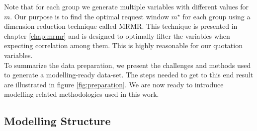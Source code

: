 \documentclass[12pt,titlepage]{article}
\begin{document}
\noindent
Note that for each group we generate multiple variables with different values for $m$. Our purpose is to find the optimal request window $m^{\star}$ for each group using a dimension reduction technique called MRMR. This technique is presented in chapter \ref{chap:mrmr} and is designed to optimally filter the variables when expecting correlation among them. This is highly reasonable for our quotation variables.\\

\noindent
To summarize the data preparation, we present the challenges and methods used to generate a modelling-ready data-set. The steps needed to get to this end result are illustrated in figure \ref{fig:preparation}. We are now ready to introduce modelling related methodologies used in this work. \\

\subsection{Modelling Structure} \par
\label{chap:modstruct}
\end{document}
